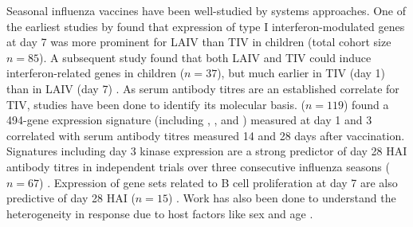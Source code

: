 Seasonal influenza vaccines have been well-studied by systems approaches.
One of the earliest studies by \textcite{zhu2010WholeGenomeTranscriptional} found that expression of type I interferon-modulated genes at day 7 was more prominent for \gls{LAIV} than \gls{TIV} in children (total cohort size $n=85$).
A subsequent study found that both \gls{LAIV} and \gls{TIV} could induce interferon-related genes in children ($n=37$), but much earlier in \gls{TIV} (day 1) than in \gls{LAIV} (day 7) \autocite{cao2014DifferencesAntibodyResponses}.
As serum antibody titres are an established correlate for \gls{TIV}, studies have been done to identify its molecular basis.
\textcite{bucasas2011EarlyPatternsGene} ($n=119$) found a 494-gene expression signature (including , , and ) measured at day 1 and 3 correlated with serum antibody titres measured 14 and 28 days after vaccination.
Signatures including day 3 kinase  expression are a strong predictor of day 28 \gls{HAI} antibody titres in independent trials over three consecutive influenza seasons ($n=67$) \autocite{nakaya2011SystemsBiologyVaccination}.
Expression of gene sets related to B cell proliferation at day 7 are also predictive of day 28 \gls{HAI} ($n=15$) \autocite{tan2014GeneSignaturesRelated}.
Work has also been done to understand the heterogeneity in response due to host factors like 
sex \autocite{furman2014SystemsAnalysisSex}
and age \autocite{frasca2010IntrinsicDefectsCell,nakaya2015SystemsAnalysisImmunity,nakaya2016SystemsBiologyImmunity,hipc-chisignaturesprojectteam2017MulticohortAnalysisReveals}.
%

